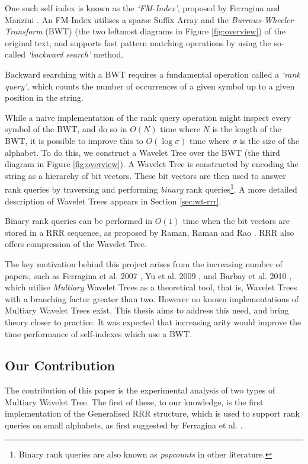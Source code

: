 One such self index is known as the \emph{`FM-Index'}, proposed by
Ferragina and Manzini \cite{ferragina2000}. An FM-Index utilises a 
sparse Suffix Array and the \emph{Burrows-Wheeler Transform} (BWT) 
\cite{burrows1994} (the two leftmost 
diagrams in Figure \ref{fig:overview}) of the original text, and supports fast 
pattern matching operations by using the so-called \emph{`backward search'} 
method.

Backward searching with a BWT requires a fundamental operation called a 
\emph{`rank query'}, which counts the number of occurrences of a given symbol up 
to a given position in the string.

While a naive implementation of the rank query operation might inspect every 
symbol of the BWT, and do so in $O(N)$ time where $N$ is the length of the BWT, 
it is possible to improve this to $O(\log \sigma)$ time where $\sigma$ is the size of 
the alphabet. To do this, we construct a Wavelet Tree \cite{grossi2003} over the BWT (the third 
diagram in Figure 
\ref{fig:overview}). A Wavelet Tree is constructed by encoding the string as a 
hierarchy of bit vectors. These bit vectors are then used to answer rank 
queries by traversing and performing \emph{binary} rank queries\footnote{ Binary rank queries are also known as \emph{popcounts} in other literature.}. A more detailed description of Wavelet Trees appears in Section \ref{sec:wt-rrr}.

Binary rank queries can be performed in $O(1)$ time when the bit vectors are stored in
a RRR sequence, as proposed by Raman, Raman and Rao \cite{raman2007}. RRR also 
offers compression of the Wavelet Tree.

The key motivation behind this project arises from the increasing number of
papers, such as Ferragina et al. 2007
\cite{ferragina2007}, Yu et al. 2009 \cite{yu2009}, and Barbay et al. 2010
\cite{barbay2010}, which utilise \emph{Multiary} Wavelet Trees as a theoretical 
tool, that is, Wavelet Trees with a branching 
factor greater than two. However no known implementations of Multiary Wavelet 
Trees exist. This thesis aims to address this need, and bring theory closer to 
practice. It was expected that increasing arity would improve the time 
performance of self-indexes which use a BWT.


\subsection{Our Contribution}

The contribution of this paper is the experimental analysis of two types of 
Multiary Wavelet Tree. 
The first of these, to our knowledge, is the first implementation of the Generalised RRR structure, which is used to support rank queries on small 
alphabets, as first suggested by Ferragina et al. \cite{ferragina2007}.

